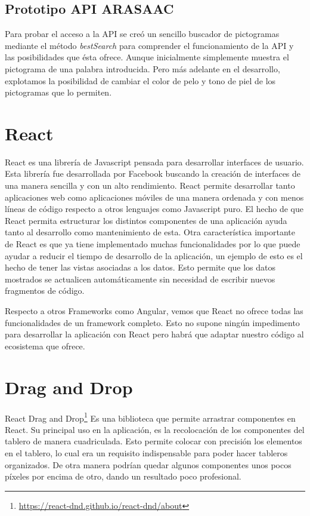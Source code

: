 \subsection{Prototipo API ARASAAC}
Para probar el acceso a la API se creó un sencillo buscador de pictogramas mediante el método \textit{bestSearch} para comprender el funcionamiento de la API y las posibilidades que ésta ofrece. Aunque inicialmente simplemente muestra el pictograma de una palabra introducida. Pero más adelante en el desarrollo, explotamos la posibilidad de cambiar el color de pelo y tono de piel de los pictogramas que lo permiten.
\section{React}

React es una librería de Javascript pensada para desarrollar interfaces de usuario. Esta librería fue desarrollada por Facebook buscando la creación de interfaces de una manera sencilla y con un alto rendimiento. 
React permite desarrollar tanto aplicaciones web como aplicaciones móviles de una manera ordenada y con menos líneas de código respecto a otros lenguajes como Javascript puro. El hecho de que React permita estructurar los distintos componentes de una aplicación ayuda tanto al desarrollo como mantenimiento de esta.
Otra característica importante de React es que ya tiene implementado muchas funcionalidades por lo que puede ayudar a reducir el tiempo de desarrollo de la aplicación, un ejemplo de esto es el hecho de tener las vistas asociadas a los datos. Esto permite que los datos mostrados se actualicen automáticamente sin necesidad de escribir nuevos fragmentos de código.

Respecto a otros Frameworks como Angular, vemos que React no ofrece todas las funcionalidades de un framework completo. Esto no supone ningún impedimento para desarrollar la aplicación con React pero habrá que adaptar nuestro código al ecosistema que ofrece.

\section{Drag and Drop}

React Drag and Drop\footnote{\url{https://react-dnd.github.io/react-dnd/about}} Es una biblioteca que permite arrastrar componentes en React. Su principal uso en la aplicación, es la recolocación de los componentes del tablero de manera cuadriculada. Esto permite colocar con precisión los elementos en el tablero, lo cual era un requisito indispensable para poder hacer tableros organizados. De otra manera podrían quedar algunos componentes unos pocos píxeles por encima de otro, dando un resultado poco profesional.


